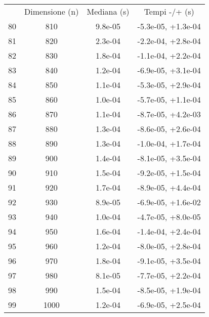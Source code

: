 \begin{table}
\centering
\begin{adjustbox}{width=1\textwidth/2}
\begin{tabular}{|c|c|c|c|}
\hline
 & Dimensione (n) & Mediana (s) & Tempi -/+ (s) \\
80 & 810 & 9.8e-05 & -5.3e-05, +1.3e-04 \\
\cline{1-4}
81 & 820 & 2.3e-04 & -2.2e-04, +2.8e-04 \\
\cline{1-4}
82 & 830 & 1.8e-04 & -1.1e-04, +2.2e-04 \\
\cline{1-4}
83 & 840 & 1.2e-04 & -6.9e-05, +3.1e-04 \\
\cline{1-4}
84 & 850 & 1.1e-04 & -5.3e-05, +2.9e-04 \\
\cline{1-4}
85 & 860 & 1.0e-04 & -5.7e-05, +1.1e-04 \\
\cline{1-4}
86 & 870 & 1.1e-04 & -8.7e-05, +4.2e-03 \\
\cline{1-4}
87 & 880 & 1.3e-04 & -8.6e-05, +2.6e-04 \\
\cline{1-4}
88 & 890 & 1.3e-04 & -1.0e-04, +1.7e-04 \\
\cline{1-4}
89 & 900 & 1.4e-04 & -8.1e-05, +3.5e-04 \\
\cline{1-4}
90 & 910 & 1.5e-04 & -9.2e-05, +1.5e-04 \\
\cline{1-4}
91 & 920 & 1.7e-04 & -8.9e-05, +4.4e-04 \\
\cline{1-4}
92 & 930 & 8.9e-05 & -6.9e-05, +1.6e-02 \\
\cline{1-4}
93 & 940 & 1.0e-04 & -4.7e-05, +8.0e-05 \\
\cline{1-4}
94 & 950 & 1.6e-04 & -1.4e-04, +2.4e-04 \\
\cline{1-4}
95 & 960 & 1.2e-04 & -8.0e-05, +2.8e-04 \\
\cline{1-4}
96 & 970 & 1.8e-04 & -9.1e-05, +3.5e-04 \\
\cline{1-4}
97 & 980 & 8.1e-05 & -7.7e-05, +2.2e-04 \\
\cline{1-4}
98 & 990 & 1.5e-04 & -8.5e-05, +1.9e-04 \\
\cline{1-4}
99 & 1000 & 1.2e-04 & -6.9e-05, +2.5e-04 \\
\cline{1-4}
\end{tabular}
\end{adjustbox}
\end{table}


